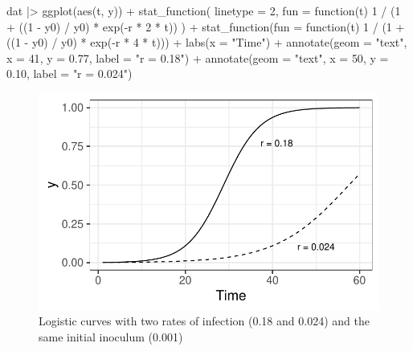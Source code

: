 \documentclass[
  letterpaper,
  DIV=11,
  numbers=noendperiod]{scrreprt}
\newenvironment{Shaded}{\begin{snugshade}}{\end{snugshade}}
\newcommand{\AttributeTok}[1]{\textcolor[rgb]{0.40,0.45,0.13}{#1}}
\newcommand{\ControlFlowTok}[1]{\textcolor[rgb]{0.00,0.23,0.31}{#1}}
\newcommand{\DecValTok}[1]{\textcolor[rgb]{0.68,0.00,0.00}{#1}}
\newcommand{\FloatTok}[1]{\textcolor[rgb]{0.68,0.00,0.00}{#1}}
\newcommand{\FunctionTok}[1]{\textcolor[rgb]{0.28,0.35,0.67}{#1}}
\newcommand{\NormalTok}[1]{\textcolor[rgb]{0.00,0.23,0.31}{#1}}
\newcommand{\SpecialCharTok}[1]{\textcolor[rgb]{0.37,0.37,0.37}{#1}}
\newcommand{\StringTok}[1]{\textcolor[rgb]{0.13,0.47,0.30}{#1}}
\begin{document}
\begin{Shaded}
\begin{Highlighting}[]
\NormalTok{dat }\SpecialCharTok{|\textgreater{}}
  \FunctionTok{ggplot}\NormalTok{(}\FunctionTok{aes}\NormalTok{(t, y)) }\SpecialCharTok{+}
  \FunctionTok{stat\_function}\NormalTok{(}
    \AttributeTok{linetype =} \DecValTok{2}\NormalTok{,}
    \AttributeTok{fun =} \ControlFlowTok{function}\NormalTok{(t) }\DecValTok{1} \SpecialCharTok{/}\NormalTok{ (}\DecValTok{1} \SpecialCharTok{+}\NormalTok{ ((}\DecValTok{1} \SpecialCharTok{{-}}\NormalTok{ y0) }\SpecialCharTok{/}\NormalTok{ y0) }\SpecialCharTok{*} \FunctionTok{exp}\NormalTok{(}\SpecialCharTok{{-}}\NormalTok{r }\SpecialCharTok{*} \DecValTok{2} \SpecialCharTok{*}\NormalTok{ t))}
\NormalTok{  ) }\SpecialCharTok{+}
  \FunctionTok{stat\_function}\NormalTok{(}\AttributeTok{fun =} \ControlFlowTok{function}\NormalTok{(t) }\DecValTok{1} \SpecialCharTok{/}\NormalTok{ (}\DecValTok{1} \SpecialCharTok{+}\NormalTok{ ((}\DecValTok{1} \SpecialCharTok{{-}}\NormalTok{ y0) }\SpecialCharTok{/}\NormalTok{ y0) }\SpecialCharTok{*} \FunctionTok{exp}\NormalTok{(}\SpecialCharTok{{-}}\NormalTok{r }\SpecialCharTok{*} \DecValTok{4} \SpecialCharTok{*}\NormalTok{ t))) }\SpecialCharTok{+}
  \FunctionTok{labs}\NormalTok{(}\AttributeTok{x =} \StringTok{"Time"}\NormalTok{) }\SpecialCharTok{+}
  \FunctionTok{annotate}\NormalTok{(}\AttributeTok{geom =} \StringTok{"text"}\NormalTok{, }\AttributeTok{x =} \DecValTok{41}\NormalTok{, }\AttributeTok{y =} \FloatTok{0.77}\NormalTok{, }\AttributeTok{label =} \StringTok{"r = 0.18"}\NormalTok{) }\SpecialCharTok{+}
  \FunctionTok{annotate}\NormalTok{(}\AttributeTok{geom =} \StringTok{"text"}\NormalTok{, }\AttributeTok{x =} \DecValTok{50}\NormalTok{, }\AttributeTok{y =} \FloatTok{0.10}\NormalTok{, }\AttributeTok{label =} \StringTok{"r = 0.024"}\NormalTok{)}
\end{Highlighting}
\end{Shaded}

\begin{figure}[H]

{\centering \includegraphics{temporal-models_files/figure-pdf/fig-log1-1.pdf}

}

\caption{\label{fig-log1}Logistic curves with two rates of infection
(0.18 and 0.024) and the same initial inoculum (0.001)}

\end{figure}
\end{document}
